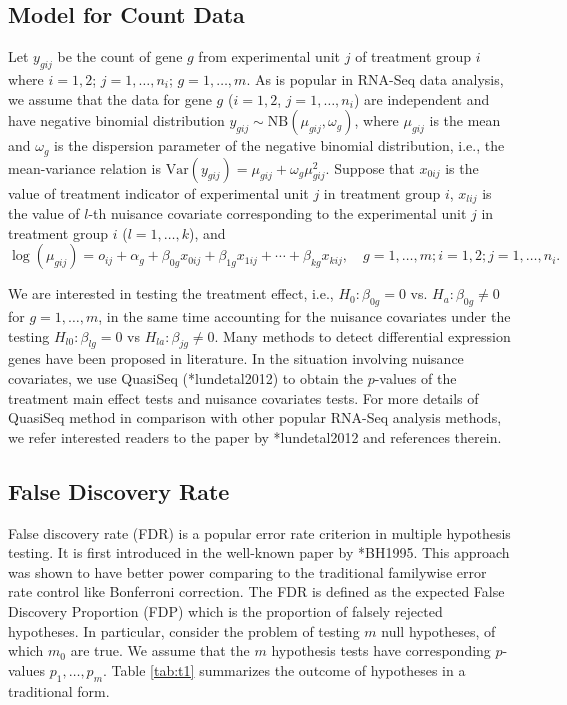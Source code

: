 \documentclass[12pt, letter]{article}\usepackage[]{graphicx}\usepackage[]{color}
\begin{document}
\subsection{ Model for Count Data}
Let $y_{gij}$ be the count of gene $g$ from experimental unit $j$ of treatment group $i$ where $i = 1,2$; $j = 1, \dots, n_i$; $g = 1, \dots, m$. As is popular in RNA-Seq data analysis, we assume that the data for gene $g$ ($i = 1, 2$, $j = 1, \dots, n_i$) are independent and have negative binomial distribution $y_{gij} \sim \mbox{NB}(\mu_{gij}, \omega_g)$, where $\mu_{gij}$ is the mean and $\omega_g$ is the dispersion parameter of the negative binomial distribution, i.e., the mean-variance relation is $\mbox{Var}(y_{gij}) = \mu_{gij} + \omega_g \mu_{gij}^2$. Suppose that $x_{0ij}$ is the value of treatment indicator of 
experimental unit $j$ in treatment group $i$, $x_{lij}$ is the value of $l$-th nuisance covariate corresponding to the experimental unit $j$ in treatment group $i$ ($l = 1, \dots, k$), and 
\[
\log(\mu_{gij}) = o_{ij} + \alpha_{g} + \beta_{0g}x_{0ij} + \beta_{1g}x_{1ij} + \cdots + \beta_{kg}x_{kij}, \quad g = 1, \dots, m; i = 1, 2; j = 1, \dots, n_i.
\]

We are interested in testing the treatment effect, i.e., $H_0: \beta_{0g} = 0$ vs. $H_a: \beta_{0g} \neq 0$ for $g =  1, \dots, m$, in the same time accounting for the nuisance covariates under the testing $H_{l0}: \beta_{lg} = 0$ vs $H_{la}: \beta_{jg} \neq 0$. Many methods to detect differential expression genes have been proposed in literature. In the situation involving nuisance covariates, we use QuasiSeq (\citeasnoun**{lundetal2012}) to obtain the $p$-values of the treatment main effect tests and nuisance covariates tests. For more details of QuasiSeq method in comparison with other popular RNA-Seq analysis methods,  we refer interested readers to the paper by \citeasnoun**{lundetal2012} and references therein.

\subsection{ False Discovery Rate}
False discovery rate (FDR) is a popular error rate criterion  in multiple hypothesis testing.  It is first introduced in the well-known paper by \citeasnoun**{BH1995}. This approach was shown to have better power comparing to the traditional familywise error rate control like Bonferroni correction. The FDR is defined as the expected False Discovery Proportion (FDP) which is the  proportion of falsely rejected hypotheses. In particular, consider the problem of testing $m$ null hypotheses, of which $m_0$ are true. We assume that the $m$ hypothesis tests have corresponding $p$-values $p_1, \dots, p_m$. Table \ref{tab:t1} summarizes the outcome of hypotheses in a traditional form. 
\end{document}
